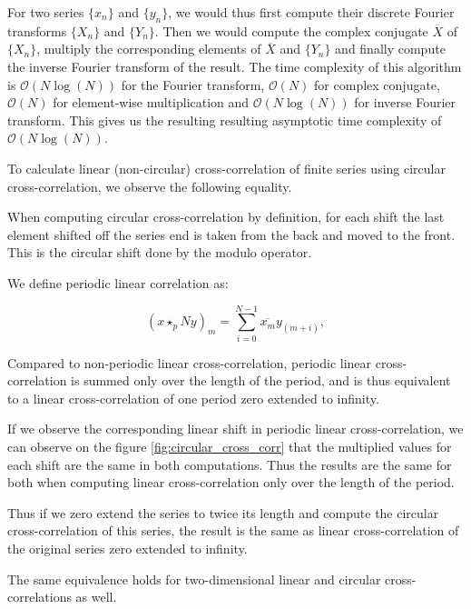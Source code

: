 For two series $\{x_n\}$ and $\{y_n\}$, we would thus first compute their discrete Fourier transforms $\{X_n\}$ and $\{Y_n\}$. Then we would compute the complex conjugate $\overline{X}$ of $\{X_n\}$, multiply the corresponding elements of $\overline{X}$ and $\{Y_n\}$ and finally compute the inverse Fourier transform of the result. The time complexity of this algorithm is $\mathcal{O}(N\log(N))$ for the Fourier transform, $\mathcal{O}(N)$ for complex conjugate, $\mathcal{O}(N)$ for element-wise multiplication and $\mathcal{O}(N\log(N))$ for inverse Fourier transform. This gives us the resulting resulting asymptotic time complexity of $\mathcal{O}(N\log(N))$.


To calculate linear (non-circular) cross-correlation of finite series using circular cross-correlation, we observe the following equality.

When computing circular cross-correlation by definition, for each shift the last element shifted off the series end is taken from the back and moved to the front. This is the circular shift done by the modulo operator. 

We define periodic linear correlation as:

\[
(x \star_pN y)_m = \sum_{i=0}^{N-1} \overline{x_m} y_{(m + i)},
\]


Compared to non-periodic linear cross-correlation, periodic linear cross-correlation is summed only over the length of the period, and is thus equivalent to a linear cross-correlation of one period zero extended to infinity.

If we observe the corresponding linear shift in periodic linear cross-correlation, we can observe on the figure \ref{fig:circular_cross_corr} that the multiplied values for each shift are the same in both computations. Thus the results are the same for both when computing linear cross-correlation only over the length of the period.

Thus if we zero extend the series to twice its length and compute the circular cross-correlation of this series, the result is the same as linear cross-correlation of the original series zero extended to infinity.


The same equivalence holds for two-dimensional linear and circular cross-correlations as well. 

